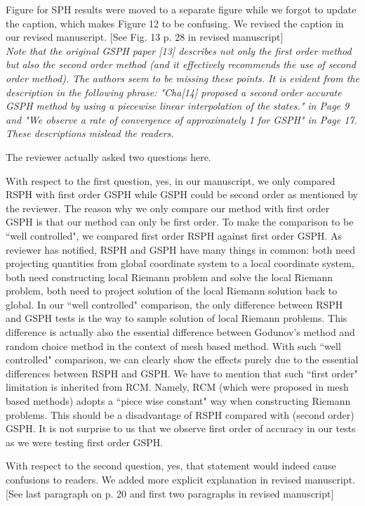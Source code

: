 \documentclass[10pt,a4paper]{article}
\begin{document}
Figure for SPH results were moved to a separate figure while we forgot to update the caption, which makes Figure 12 to be confusing. We revised the caption in our revised manuscript.
[See Fig. 13 p. 28 in revised manuscript]
\\[3pt]


\textit{Note that the original GSPH paper [13] describes not only the first order method but also the second order method (and it effectively recommends the use of second order method). The authors seem to be missing these points. It is evident from the description in the following phrase: "Cha[14] proposed a second order accurate GSPH method by using a piecewise linear interpolation of the states." in Page 9 and "We observe a rate of convergence of approximately 1 for GSPH" in Page 17. These descriptions mislead the readers.}

The reviewer actually asked two questions here.
 
With respect to the first question, yes, in our manuscript, we only compared RSPH with first order GSPH while GSPH could be second order as mentioned by the reviewer. The reason why we only compare our method with first order GSPH is that our method can only be first order. To make the comparison to be ``well controlled", we compared first order RSPH against first order GSPH. As reviewer has notified, RSPH and GSPH have many things in common: both need projecting quantities from global coordinate system to a local coordinate system, both need constructing local Riemann problem and solve the local Riemann problem, both need to project solution of the local Riemann solution back to global. In our ``well controlled" comparison, the only difference between RSPH and GSPH tests is the way to sample solution of local Riemann problems. This difference is actually also the essential difference between Godunov's method and random choice method in the context of mesh based method. With such ``well controlled" comparison, we can clearly show the effects purely due to the essential differences between RSPH and GSPH. We have to mention that such ``first order" limitation is inherited from RCM. Namely, RCM (which were proposed in mesh based methods) adopts a ``piece wise constant" way when constructing Riemann problems. This should be a disadvantage of RSPH compared with (second order) GSPH.
It is not surprise to us that we observe first order of accuracy in our tests as we were testing first order GSPH.

With respect to the second question, yes, that statement would indeed cause confusions to readers. We added more explicit explanation in revised manuscript.
[See last paragraph on p. 20 and first two paragraphs in revised manuscript] 
\\[3pt]
\end{document}

